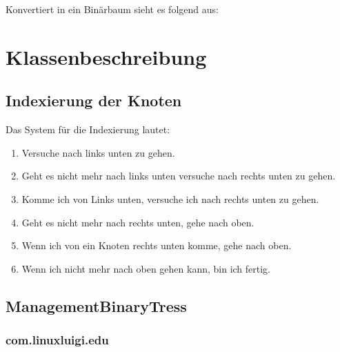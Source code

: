 \documentclass[letterpaper,10pt,ngerman]{sphinxmanual}
\begin{document}
Konvertiert in ein Binärbaum sieht es folgend aus:

\noindent{}


\chapter{Klassenbeschreibung}
\label{\detokenize{index:klassenbeschreibung}}

\section{Indexierung der Knoten}
\label{\detokenize{aboutIndex::doc}}\label{\detokenize{aboutIndex:indexierung-der-knoten}}
Das System für die Indexierung lautet:
\begin{enumerate}
\item {} 
Versuche nach links unten zu gehen.

\item {} 
Geht es nicht mehr nach links unten versuche nach rechts unten zu gehen.

\item {} 
Komme ich von Links unten, versuche ich nach rechts unten zu gehen.

\item {} 
Geht es nicht mehr nach rechts unten, gehe nach oben.

\item {} 
Wenn ich von ein Knoten rechts unten komme, gehe nach oben.

\item {} 
Wenn ich nicht mehr nach oben gehen kann, bin ich fertig.

\end{enumerate}

\noindent{}


\section{ManagementBinaryTress}
\label{\detokenize{packages::doc}}\label{\detokenize{packages:managementbinarytress}}

\subsection{com.linuxluigi.edu}
\label{\detokenize{com/linuxluigi/edu/package-index::doc}}\label{\detokenize{com/linuxluigi/edu/package-index:package-com.linuxluigi.edu}}\label{\detokenize{com/linuxluigi/edu/package-index:com-linuxluigi-edu}}
\end{document}
